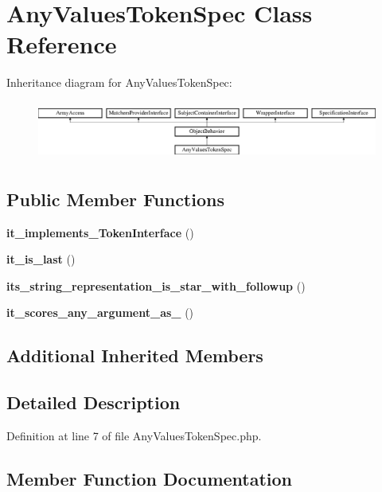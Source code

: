 \section{Any\+Values\+Token\+Spec Class Reference}
\label{classspec_1_1_prophecy_1_1_argument_1_1_token_1_1_any_values_token_spec}
Inheritance diagram for Any\+Values\+Token\+Spec\+:\begin{figure}[H]
\begin{center}
\leavevmode
\includegraphics[height=1.953488cm]{classspec_1_1_prophecy_1_1_argument_1_1_token_1_1_any_values_token_spec}
\end{center}
\end{figure}
\subsection*{Public Member Functions}
\begin{DoxyCompactItemize}
\item 
{\bf it\+\_\+implements\+\_\+\+Token\+Interface} ()
\item 
{\bf it\+\_\+is\+\_\+last} ()
\item 
{\bf its\+\_\+string\+\_\+representation\+\_\+is\+\_\+star\+\_\+with\+\_\+followup} ()
\item 
{\bf it\+\_\+scores\+\_\+any\+\_\+argument\+\_\+as\+\_} ()
\end{DoxyCompactItemize}
\subsection*{Additional Inherited Members}


\subsection{Detailed Description}


Definition at line 7 of file Any\+Values\+Token\+Spec.\+php.



\subsection{Member Function Documentation}
